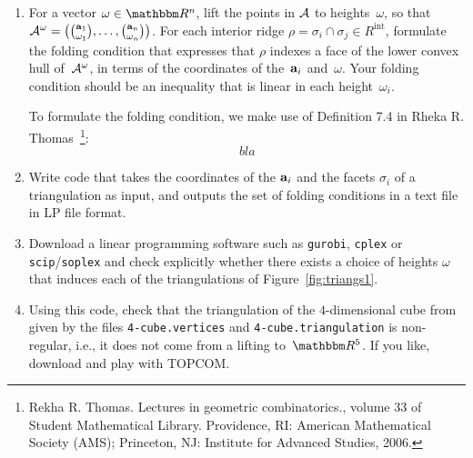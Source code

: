 \begin{enumerate}
  \item
    For a vector $\omega\in\RR^n$, lift the points in $\mathcal{A}$ to heights~$\omega$, so that
    $\mathcal{A}^\omega=\big(\binom{\mathbf{a}_1}{\omega_1},\dots,\binom{\mathbf{a}_n}{\omega_n}\big)$.
    For each interior ridge $\rho=\sigma_i\cap\sigma_j\in R^{\text{int}}$,
    formulate the folding condition that expresses that $\rho$ indexes a face of the lower convex hull of~$\mathcal{A}^\omega$,
    in terms of the coordinates of the~$\mathbf{a}_i$ and~$\omega$.
    Your folding condition should be an inequality that is linear in each height~$\omega_i$.

To formulate the folding condition, we make use of Definition 7.4 in Rheka R. Thomas~\footnote{Rekha R. Thomas. Lectures in geometric combinatorics., volume 33 of Student Mathematical Library. Providence, RI: American Mathematical Society (AMS); Princeton, NJ: Institute for Advanced Studies, 2006.}:
        \begin{equation*}
            bla
        \end{equation*}

  \item
    Write code that takes the coordinates of the $\mathbf{a}_i$ and the facets $\sigma_i$ of a triangulation as input,
    and outputs the set of folding conditions in a text file in
    LP file format.

  \item
    Download a linear programming software such as
    \texttt{gurobi},
    \texttt{cplex} or
    \texttt{scip}/\texttt{soplex}
    and check explicitly whether there exists a choice of heights $\omega$ that induces each of the triangulations of Figure~\ref{fig:triangs1}.

  \item
    Using this code,
    check that the triangulation of the $4$-dimensional cube from~\cite{deLoera96}
    given by the files \texttt{4-cube.vertices} and \texttt{4-cube.triangulation}
    is non-regular, i.e., it does not come from a lifting to~$\RR^5$.
    If you like, download and play with TOPCOM.
  \end{enumerate}
